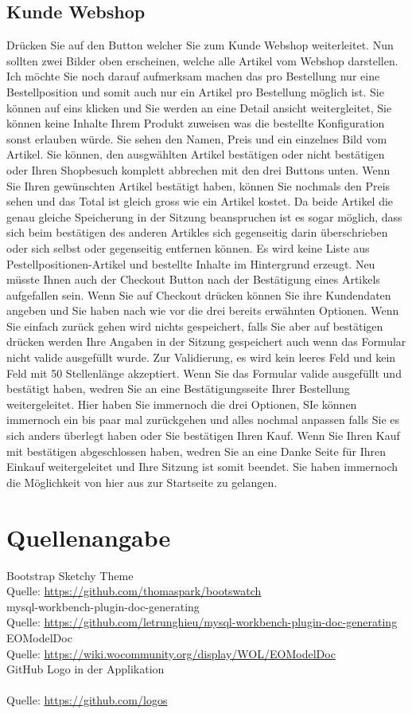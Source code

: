 \documentclass{article}
\newcommand*{\quelle}{
  \footnotesize Quelle:
}
\begin{document}
\subsection{Kunde Webshop}
Drücken Sie auf den Button welcher Sie zum Kunde Webshop weiterleitet.
Nun sollten zwei Bilder oben erscheinen, welche alle Artikel vom Webshop darstellen.
Ich möchte Sie noch darauf aufmerksam machen das pro Bestellung nur eine Bestellposition und somit auch nur ein Artikel pro Bestellung möglich ist.
Sie können auf eins klicken und Sie werden an eine Detail ansicht weitergleitet, Sie können keine Inhalte Ihrem Produkt zuweisen was die bestellte Konfiguration sonst erlauben würde.
Sie sehen den Namen, Preis und ein einzelnes Bild vom Artikel.
Sie können, den ausgwählten Artikel bestätigen oder nicht bestätigen oder Ihren Shopbesuch komplett abbrechen mit den drei Buttons unten.
Wenn Sie Ihren gewünschten Artikel bestätigt haben, können Sie nochmals den Preis sehen und das Total ist gleich gross wie ein Artikel kostet.
Da beide Artikel die genau gleiche Speicherung in der Sitzung beanspruchen ist es sogar möglich, dass sich beim bestätigen des anderen Artikles sich gegenseitig darin überschrieben oder sich selbst oder gegenseitig entfernen können.
Es wird keine Liste aus Pestellpositionen-Artikel und bestellte Inhalte im Hintergrund erzeugt.
Neu müsste Ihnen auch der Checkout Button nach der Bestätigung eines Artikels aufgefallen sein.
Wenn Sie auf Checkout drücken können Sie ihre Kundendaten angeben und Sie haben nach wie vor die drei bereits erwähnten Optionen.
Wenn Sie einfach zurück gehen wird nichts gespeichert, falls Sie aber auf bestätigen drücken werden Ihre Angaben in der Sitzung gespeichert auch wenn das Formular nicht valide ausgefüllt wurde.
Zur Validierung, es wird kein leeres Feld und kein Feld mit 50 Stellenlänge akzeptiert.
Wenn Sie das Formular valide ausgefüllt und bestätigt haben, wedren Sie an eine Bestätigungsseite Ihrer Bestellung weitergeleitet.
Hier haben Sie immernoch die drei Optionen, SIe können immernoch ein bis paar mal zurückgehen und alles nochmal anpassen falls Sie es sich anders überlegt haben oder Sie bestätigen Ihren Kauf.
Wenn Sie Ihren Kauf mit bestätigen abgeschlossen haben, wedren Sie an eine Danke Seite für Ihren Einkauf weitergeleitet und Ihre Sitzung ist somit beendet.
Sie haben immernoch die Möglichkeit von hier aus zur Startseite zu gelangen.
\section{Quellenangabe}
Bootstrap Sketchy Theme\\
\quelle\url{https://github.com/thomaspark/bootswatch}\\
mysql-workbench-plugin-doc-generating\\
\quelle\url{https://github.com/letrunghieu/mysql-workbench-plugin-doc-generating}\\
EOModelDoc\\
\quelle\url{https://wiki.wocommunity.org/display/WOL/EOModelDoc}\\
GitHub Logo in der Applikation\\
\\
\quelle\url{https://github.com/logos}\\
\end{document}
